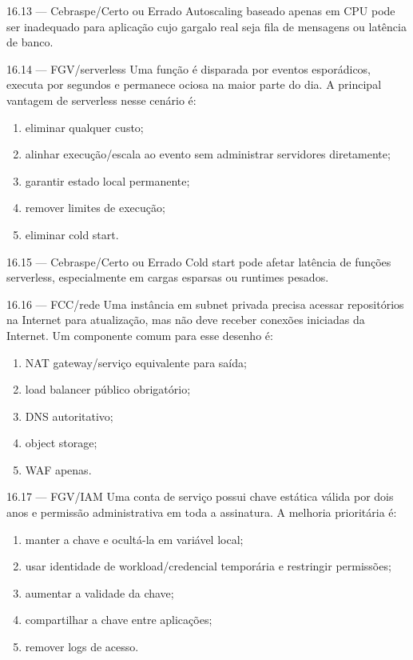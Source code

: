 \begin{questao}{ 16.13 — Cebraspe/Certo ou Errado}
Autoscaling baseado apenas em CPU pode ser inadequado para aplicação cujo gargalo real seja fila de mensagens ou latência de banco.
\end{questao}

\begin{questao}{ 16.14 — FGV/serverless}
Uma função é disparada por eventos esporádicos, executa por segundos e permanece ociosa na maior parte do dia. A principal vantagem de serverless nesse cenário é:
\begin{enumerate}[label=\Alph*)]
\item eliminar qualquer custo;
\item alinhar execução/escala ao evento sem administrar servidores diretamente;
\item garantir estado local permanente;
\item remover limites de execução;
\item eliminar cold start.
\end{enumerate}
\end{questao}

\begin{questao}{ 16.15 — Cebraspe/Certo ou Errado}
Cold start pode afetar latência de funções serverless, especialmente em cargas esparsas ou runtimes pesados.
\end{questao}

\begin{questao}{ 16.16 — FCC/rede}
Uma instância em subnet privada precisa acessar repositórios na Internet para atualização, mas não deve receber conexões iniciadas da Internet. Um componente comum para esse desenho é:
\begin{enumerate}[label=\Alph*)]
\item NAT gateway/serviço equivalente para saída;
\item load balancer público obrigatório;
\item DNS autoritativo;
\item object storage;
\item WAF apenas.
\end{enumerate}
\end{questao}

\begin{questao}{ 16.17 — FGV/IAM}
Uma conta de serviço possui chave estática válida por dois anos e permissão administrativa em toda a assinatura. A melhoria prioritária é:
\begin{enumerate}[label=\Alph*)]
\item manter a chave e ocultá-la em variável local;
\item usar identidade de workload/credencial temporária e restringir permissões;
\item aumentar a validade da chave;
\item compartilhar a chave entre aplicações;
\item remover logs de acesso.
\end{enumerate}
\end{questao}

